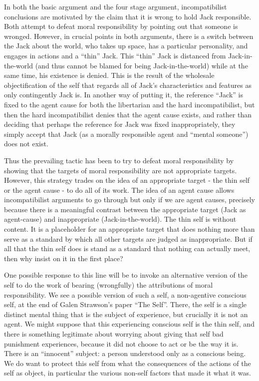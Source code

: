 \documentclass[phd,12pt,oneside,paper=letterpaper]{ubcthesis}
\begin{document}
In both the basic argument and the four stage argument, incompatibilist conclusions are motivated by the claim that it is wrong to hold Jack responsible. Both attempt to defeat moral responsibility by pointing out that someone is wronged. However, in crucial points in both arguments, there is a switch between the Jack about the world, who takes up space, has a particular personality, and engages in actions and a ``thin'' Jack. This ``thin'' Jack is distanced from Jack-in-the-world (and thus cannot be blamed for being Jack-in-the-world) while at the same time, his existence is denied. This is the result of the wholesale objectification of the self that regards all of Jack's characteristics and features as only contingently Jack is. In another way of putting it, the reference ``Jack'' is fixed to the agent cause for both the libertarian and the hard incompatibilist, but then the hard incompatibilist denies that the agent cause exists, and rather than deciding that perhaps the reference for Jack was fixed inappropriately, they simply accept that Jack (as a morally responsible agent and ``mental someone'') does not exist. 

Thus the prevailing tactic has been to try to defeat moral responsibility by showing that the targets of moral responsibility are not appropriate targets. However, this strategy trades on the idea of an appropriate target - the thin self or the agent cause - to do all of its work. The idea of an agent cause allows incompatibilist arguments to go through but only if we are agent causes, precisely because there is a meaningful contrast between the appropriate target (Jack as agent-cause) and inappropriate (Jack-in-the-world). The thin self is without content. It is a placeholder for an appropriate target that does nothing more than serve as a standard by which all other targets are judged as inappropriate. But if all that the thin self does is stand as a standard that nothing can actually meet, then why insist on it in the first place? 

One possible response to this line will be to invoke an alternative version of the self to do the work of bearing (wrongfully) the attributions of moral responsibility. We see a possible version of such a self, a non-agentive conscious self, at the end of Galen Strawson's \citeyearpar{strawsong1997} paper ``The Self''.  There, the self is a single distinct mental thing that is the subject of experience, but crucially it is not an agent. We might suppose that this experiencing conscious self is the thin self, and there is something legitimate about worrying about giving that self bad punishment experiences, because it did not choose to act or be the way it is. There is an ``innocent'' subject: a person understood only as a conscious being. We do want to protect this self from what the consequences of the actions of the self as object, in particular the various non-self factors that made it what it was. 
\end{document}
